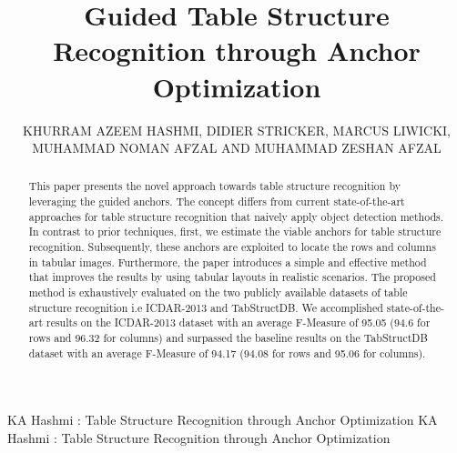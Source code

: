 \documentclass{ieeeaccess}
\begin{document}
\title{Guided Table Structure Recognition through Anchor Optimization}
\author{\uppercase{Khurram Azeem Hashmi},     \uppercase{Didier Stricker, Marcus Liwicki, Muhammad Noman Afzal and Muhammad Zeshan Afzal}
}

\address[1]{German Research Center for Artificial Intelligence, 67663 Kaiserslautern, Germany}
\address[2]{Department of Computer Science, University of Kaiserslautern, 67663 Kaiserslautern, Germany}
\address[3]{Mindgrage, University of Kaiserslautern, 67663 Kaiserslautern, Germany}
\address[4]{Luleå University of Technology, A3570 Luleå, Sweden}
\address[5]{Bilojix Soft Technologies, Bahawalpur. Pakistan} 


\markboth
{KA Hashmi \headeretal: Table Structure Recognition through Anchor Optimization}
{KA Hashmi \headeretal: Table Structure Recognition through Anchor Optimization}


\begin{abstract}


This paper presents the novel approach towards table structure recognition by leveraging the guided anchors. The concept differs from current state-of-the-art approaches for table structure recognition that naively apply object detection methods. In contrast to prior techniques, first, we estimate the viable anchors for table structure recognition. Subsequently, these anchors are exploited to locate the rows and columns in tabular images. Furthermore, the paper introduces a simple and effective method that improves the results by using tabular layouts in realistic scenarios. The proposed method is exhaustively evaluated on the two publicly available datasets of table structure recognition i.e ICDAR-2013 and TabStructDB. We accomplished state-of-the-art results on the ICDAR-2013 dataset with an average F-Measure of 95.05 (94.6 for rows and 96.32 for columns) and surpassed the baseline results on the TabStructDB dataset with an average F-Measure of 94.17 (94.08 for rows and 95.06 for columns).









 


\end{abstract}
\end{document}
